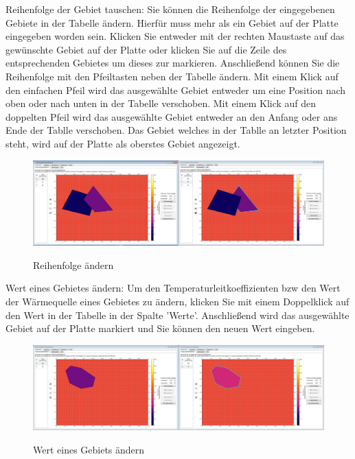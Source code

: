 \noindent
Reihenfolge der Gebiet tauschen: Sie können die Reihenfolge der eingegebenen Gebiete in der Tabelle ändern. Hierfür muss mehr als ein Gebiet auf der Platte eingegeben worden sein. Klicken Sie entweder mit der rechten Maustaste auf das gewünschte Gebiet auf der Platte oder klicken Sie auf die Zeile des entsprechenden Gebietes um dieses zur markieren. Anschließend können Sie die Reihenfolge mit den Pfeiltasten neben der Tabelle ändern. Mit einem Klick auf den einfachen Pfeil wird das ausgewählte Gebiet entweder um eine Position nach oben oder nach unten in der Tabelle verschoben. Mit einem Klick auf den doppelten Pfeil wird das ausgewählte Gebiet entweder an den Anfang oder ans Ende der Tablle verschoben. Das Gebiet welches in der Tablle an letzter Position steht, wird auf der Platte als oberstes Gebiet angezeigt.
\begin{figure}[H]
\centering
\includegraphics[scale=.25]{Bilder/ReihenfolgeAendern.png}\\
\caption{Reihenfolge ändern}
\label{ReihenfolgeAendern}
\end{figure}

\newpage
\noindent
Wert eines Gebietes ändern: Um den Temperaturleitkoeffizienten bzw den Wert der Wärmequelle eines Gebietes zu ändern, klicken Sie mit einem Doppelklick auf den Wert in der Tabelle in der Spalte 'Werte'. Anschließend wird das ausgewählte Gebiet auf der Platte markiert und Sie können den neuen Wert eingeben.
\begin{figure}[H]
\centering
\includegraphics[scale=.25]{Bilder/WertAendern.png}\\
\caption{Wert eines Gebiets ändern}
\label{WertAendern}
\end{figure}

